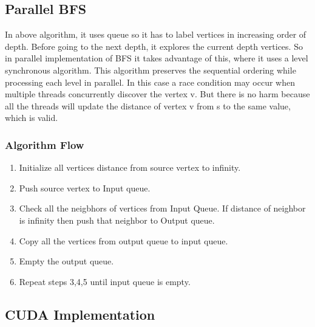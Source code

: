 \documentclass{article}
\begin{document}

\subsection{Parallel BFS}
In above algorithm, it uses queue so it has to label vertices in increasing order of depth. Before going to the next depth, it explores the current depth vertices. So in parallel implementation of BFS it takes advantage of this, where it uses a level synchronous algorithm. This algorithm preserves the sequential ordering while processing each level in parallel. In this case a race condition may occur when multiple threads concurrently discover the vertex v. But there is no harm because all the threads will update the distance of vertex v from s to the same value, which is valid.

\subsubsection{Algorithm Flow}
\begin{enumerate}
\item Initialize all vertices distance from source vertex to infinity.
\item Push source vertex to Input queue.
\item Check all the neigbhors of vertices from Input Queue. If distance of neighbor is infinity then push that neighbor to Output queue.
\item Copy all the vertices from output queue to input queue.
\item Empty the output queue.
\item Repeat steps 3,4,5 until input queue is empty.
\end{enumerate}


\subsection{CUDA Implementation}
\end{document}
